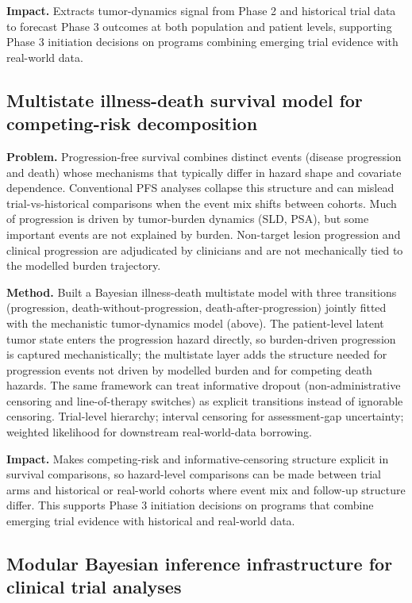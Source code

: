 \documentclass[11pt]{article}
\begin{document}
\textbf{Impact.} Extracts tumor-dynamics signal from Phase 2 and historical trial data to forecast Phase 3 outcomes at both population and patient levels, supporting Phase 3 initiation decisions on programs combining emerging trial evidence with real-world data.

\subsection*{Multistate illness-death survival model for competing-risk decomposition}

\textbf{Problem.} Progression-free survival combines distinct events (disease progression and death) whose mechanisms that typically differ in hazard shape and covariate dependence. Conventional PFS analyses collapse this structure and can mislead trial-vs-historical comparisons when the event mix shifts between cohorts. Much of progression is driven by tumor-burden dynamics (SLD, PSA), but some important events are not explained by burden. Non-target lesion progression and clinical progression are adjudicated by clinicians and are not mechanically tied to the modelled burden trajectory.

\textbf{Method.} Built a Bayesian illness-death multistate model with three transitions (progression, death-without-pro\-gression, death-after-progression) jointly fitted with the mechanistic tumor-dynamics model (above). The patient-level latent tumor state enters the progression hazard directly, so burden-driven progression is captured mechanistically; the multistate layer adds the structure needed for progression events not driven by modelled burden and for competing death hazards. The same framework can treat informative dropout (non-administrative censoring and line-of-therapy switches) as explicit transitions instead of ignorable censoring. Trial-level hierarchy; interval censoring for assessment-gap uncertainty; weighted likelihood for downstream real-world-data borrowing.

\textbf{Impact.} Makes competing-risk and informative-censoring structure explicit in survival comparisons, so hazard-level comparisons can be made between trial arms and historical or real-world cohorts where event mix and follow-up structure differ. This supports Phase 3 initiation decisions on programs that combine emerging trial evidence with historical and real-world data.

\subsection*{Modular Bayesian inference infrastructure for clinical trial analyses}
\end{document}
